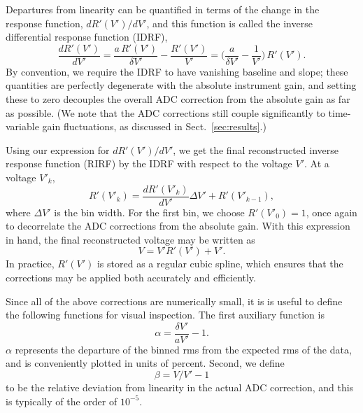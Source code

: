 \documentclass[twocolumn]{aa}
\begin{document}
Departures from linearity can be quantified in terms of the change in the response function, $dR'(V')/dV'$, and this function is called the inverse differential response function (IDRF),
\begin{equation}
\frac{dR'(V')}{dV'} = \frac{a\,R'(V')}{\delta V'} - \frac{R'(V')}{V'} = \Big(\frac{a}{\delta V'} - \frac{1}{V'} \Big)\, R'(V').
\label{eq:idrf}
\end{equation}
By convention, we require the IDRF to have vanishing baseline and slope; these quantities are perfectly degenerate with the absolute instrument gain, and setting these to zero decouples the overall ADC correction from the absolute gain as far as possible. (We note that the ADC corrections still couple significantly to time-variable gain fluctuations, as discussed in Sect.~\ref{sec:results}.) 

Using our expression for $dR'(V')/dV'$, we get the final reconstructed inverse response function (RIRF) by the IDRF with respect to the voltage $V'$. At a voltage $V'_k$, 
\begin{equation}
R'(V'_k) = \frac{dR'(V'_k)}{dV'}\Delta V' + R'(V'_{k-1}),
\label{eq:rirf}
\end{equation}
where $\Delta V'$ is the bin width. For the first bin, we choose ${R'(V'_0)=1}$, once again to decorrelate the ADC corrections from the absolute gain. With this expression in hand, the final reconstructed voltage may be written as
\begin{equation}
  V = V'R'(V') + V'.
  \label{eq:tot_correction}
\end{equation}
In practice, $R'(V')$ is stored as a regular cubic spline, which ensures that the corrections may be applied both accurately and efficiently.

Since all of the above corrections are numerically small, it is is useful to define the following functions for visual inspection. The first auxiliary function is
\begin{equation}
\alpha = \frac{\delta V'}{aV'}-1.
\label{eq:alpha_def}
\end{equation}
$\alpha$ represents the departure of the binned rms from the expected rms of the data, and is conveniently plotted in units of percent. Second, we define
\begin{equation}
\beta = V/V'-1
\label{eq:beta_def}
\end{equation}
to be the relative deviation from linearity in the actual ADC correction, and this is typically of the order of $10^{-5}$.
\end{document}
